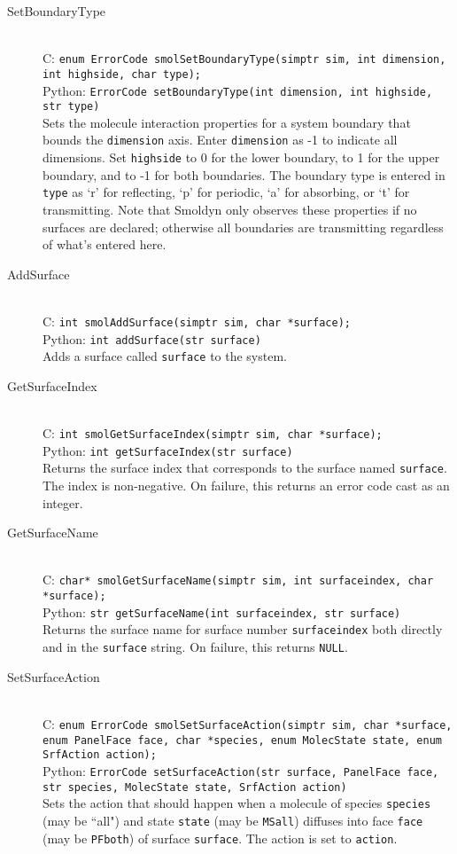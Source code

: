 \documentclass {book}
\begin{document}
\begin{description}

\item[SetBoundaryType]
\hfill \\
C: \texttt{enum ErrorCode smolSetBoundaryType(simptr sim, int dimension, int highside, char type);}\\
Python: \texttt{ErrorCode setBoundaryType(int dimension, int highside, str type)}\\
Sets the molecule interaction properties for a system boundary that bounds the \texttt{dimension} axis. Enter \texttt{dimension} as -1 to indicate all dimensions. Set \texttt{highside} to 0 for the lower boundary, to 1 for the upper boundary, and to -1 for both boundaries. The boundary type is entered in \texttt{type} as `r' for reflecting, `p' for periodic, `a' for absorbing, or `t' for transmitting. Note that Smoldyn only observes these properties if no surfaces are declared; otherwise all boundaries are transmitting regardless of what's entered here.

\item[AddSurface]
\hfill \\
C: \texttt{int smolAddSurface(simptr sim, char *surface);}\\
Python: \texttt{int addSurface(str surface)}\\
Adds a surface called \texttt{surface} to the system.

\item[GetSurfaceIndex]
\hfill \\
C: \texttt{int smolGetSurfaceIndex(simptr sim, char *surface);}\\
Python: \texttt{int getSurfaceIndex(str surface)}\\
Returns the surface index that corresponds to the surface named \texttt{surface}. The index is non-negative. On failure, this returns an error code cast as an integer.

\item[GetSurfaceName]
\hfill \\
C: \texttt{char* smolGetSurfaceName(simptr sim, int surfaceindex, char *surface);}\\
Python: \texttt{str getSurfaceName(int surfaceindex, str surface)}\\
Returns the surface name for surface number \texttt{surfaceindex} both directly and in the \texttt{surface} string. On failure, this returns \texttt{NULL}.

\item[SetSurfaceAction]
\hfill \\
C: \texttt{enum ErrorCode smolSetSurfaceAction(simptr sim, char *surface, enum PanelFace face, char *species, enum MolecState state, enum SrfAction action);}\\
Python: \texttt{ErrorCode setSurfaceAction(str surface, PanelFace face, str species, MolecState state, SrfAction action)}\\
Sets the action that should happen when a molecule of species \texttt{species} (may be ``all") and state \texttt{state} (may be \texttt{MSall}) diffuses into face \texttt{face} (may be \texttt{PFboth}) of surface \texttt{surface}. The action is set to \texttt{action}.


\end{description}
\end{document}
